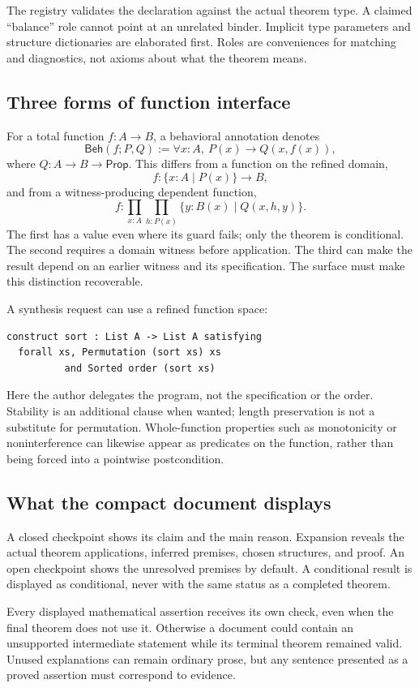 \documentclass[11pt,a4paper]{article}
\newcommand{\Prop}{\ensuremath{\mathsf{Prop}}}\newcommand{\Req}{\mathsf{Req}}
\newcommand{\Beh}{\mathsf{Beh}}\newcommand{\Spec}{\mathsf{Spec}}
\theoremstyle{definition}\newtheorem{definition}[theorem]{Definition}
\theoremstyle{remark}\newtheorem{remark}[theorem]{Remark}
\begin{document}
The registry validates the declaration against the actual theorem type. A claimed ``balance'' role cannot point at an unrelated binder. Implicit type parameters and structure dictionaries are elaborated first. Roles are conveniences for matching and diagnostics, not axioms about what the theorem means.

\subsection{Three forms of function interface}
For a total function $f:A\to B$, a behavioral annotation denotes
\begin{equation}\label{eq:beh}
 \Beh(f;P,Q):=\forall x:A,\ P(x)\to Q(x,f(x)),
\end{equation}
where $Q:A\to B\to\Prop$. This differs from a function on the refined domain,
\[
 f:\{x:A\mid P(x)\}\to B,
\]
and from a witness-producing dependent function,
\[
 f:\prod_{x:A}\prod_{h:P(x)}\{y:B(x)\mid Q(x,h,y)\}.
\]
The first has a value even where its guard fails; only the theorem is conditional. The second requires a domain witness before application. The third can make the result depend on an earlier witness and its specification. The surface must make this distinction recoverable.

A synthesis request can use a refined function space:
\begin{lstlisting}
construct sort : List A -> List A satisfying
  forall xs, Permutation (sort xs) xs
          and Sorted order (sort xs)
\end{lstlisting}
Here the author delegates the program, not the specification or the order. Stability is an additional clause when wanted; length preservation is not a substitute for permutation. Whole-function properties such as monotonicity or noninterference can likewise appear as predicates on the function, rather than being forced into a pointwise postcondition.

\subsection{What the compact document displays}
A closed checkpoint shows its claim and the main reason. Expansion reveals the actual theorem applications, inferred premises, chosen structures, and proof. An open checkpoint shows the unresolved premises by default. A conditional result is displayed as conditional, never with the same status as a completed theorem.

Every displayed mathematical assertion receives its own check, even when the final theorem does not use it. Otherwise a document could contain an unsupported intermediate statement while its terminal theorem remained valid. Unused explanations can remain ordinary prose, but any sentence presented as a proved assertion must correspond to evidence.
\end{document}
